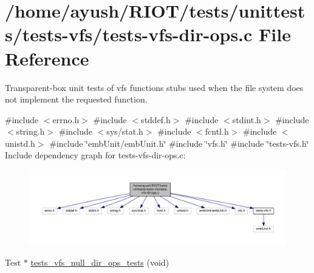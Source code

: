 \hypertarget{tests-vfs-dir-ops_8c}{}\section{/home/ayush/\+R\+I\+O\+T/tests/unittests/tests-\/vfs/tests-\/vfs-\/dir-\/ops.c File Reference}
\label{tests-vfs-dir-ops_8c}


Transparent-\/box unit tests of vfs functions stubs used when the file system does not implement the requested function.  


{\ttfamily \#include $<$errno.\+h$>$}\newline
{\ttfamily \#include $<$stddef.\+h$>$}\newline
{\ttfamily \#include $<$stdint.\+h$>$}\newline
{\ttfamily \#include $<$string.\+h$>$}\newline
{\ttfamily \#include $<$sys/stat.\+h$>$}\newline
{\ttfamily \#include $<$fcntl.\+h$>$}\newline
{\ttfamily \#include $<$unistd.\+h$>$}\newline
{\ttfamily \#include \char`\"{}emb\+Unit/emb\+Unit.\+h\char`\"{}}\newline
{\ttfamily \#include \char`\"{}vfs.\+h\char`\"{}}\newline
{\ttfamily \#include \char`\"{}tests-\/vfs.\+h\char`\"{}}\newline
Include dependency graph for tests-\/vfs-\/dir-\/ops.c\+:
\nopagebreak
\begin{figure}[H]
\begin{center}
\leavevmode
\includegraphics[width=350pt]{tests-vfs-dir-ops_8c__incl}
\end{center}
\end{figure}
\begin{DoxyCompactItemize}
\item 
Test $\ast$ \hyperlink{tests-vfs-dir-ops_8c_a5e6248f295aefb41b6a0888f647e8fd9}{tests\+\_\+vfs\+\_\+null\+\_\+dir\+\_\+ops\+\_\+tests} (void)
\end{DoxyCompactItemize}


